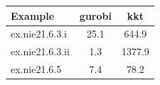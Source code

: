 \begin{tabular}{lcc}
\hline
Example & gurobi & kkt \\
\hline
ex.nie21.6.3.i & 25.1 & 644.9 \\
ex.nie21.6.3.ii & 1.3 & 1377.9 \\
ex.nie21.6.5 & 7.4 & 78.2 \\
\hline
\end{tabular}